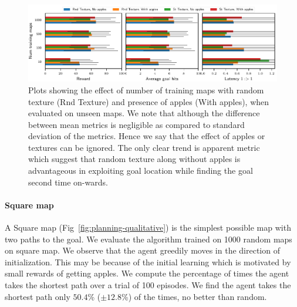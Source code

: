 \begin{figure}%
  \includegraphics[width=\linewidth]{images/plot_ntrain_summary.pdf}%
  \vspace{-1em}%
  \caption{Plots showing the effect of number of training maps with random texture (Rnd Texture) and presence of apples (With apples), when evaluated on unseen maps. We note that although the difference between mean metrics is negligible as compared to standard deviation of the metrics. Hence we say that the effect of apples or textures can be ignored.
  The only clear trend is apparent \LatencyOneGtOne{} metric which suggest that random texture along without apples is advantageous in exploiting goal location while finding the goal second time on-wards.}
  \label{fig:num-training-maps}
\end{figure}

\paragraph{Square map}
A Square map (Fig~\ref{fig:planning-qualitative}) is the simplest possible map with two paths to the goal.
We evaluate the algorithm trained on 1000 random maps on square map.
We observe that the agent greedily moves in the direction of
initialization.
This may be because of the initial learning which is
motivated by small rewards of getting apples.
We compute the percentage of times the agent takes the shortest path over a trial of 100 episodes.
We find the agent takes the shortest path only $50.4$\% ($\pm 12.8$\%) of the times, no better than random.

